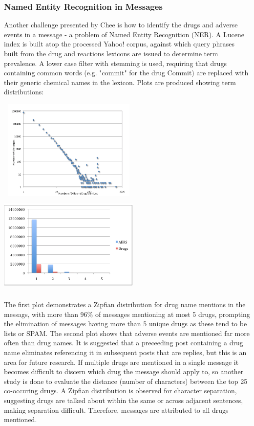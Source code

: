\documentclass[twoside,11pt]{article}
\begin{document}
\subsubsection{Named Entity Recognition in Messages}
Another challenge presented by Chee is how to identify the drugs and adverse events in a message - a problem of Named Entity Recognition (NER). A Lucene index is built atop the processed Yahoo! corpus, against which query phrases built from the drug and reactions lexicons are issued to determine term prevalence. A lower case filter with stemming is used, requiring that drugs containing common words (e.g. "commit" for the drug Commit) are replaced with their generic chemical names in the lexicon. Plots are produced showing term distributions:

\includegraphics[width=7cm, height=5cm]{Figure-1-Zipfian.png}
\includegraphics[width=7cm, height=5cm]{Figure-2-AERS_Drugs.png}

The first plot demonstrates a Zipfian distribution for drug name mentions in the messags, with more than 96\% of messages mentioning at most 5 drugs, prompting the elimination of messages having more than 5 unique drugs as these tend to be lists or SPAM. The second plot shows that adverse events are mentioned far more often than drug names. It is suggested that a preceeding post containing a drug name eliminates referencing it in subsequent posts that are replies, but this is an area for future research. If multiple drugs are mentioned in a single message it becomes difficult to discern which drug the message should apply to, so another study is done to evaluate the distance (number of characters) between the top 25 co-occuring drugs. A Zipfian distribution is observed for character separation, suggesting drugs are talked about within the same or across adjacent sentences, making separation difficult. Therefore, messages are attributed to all drugs mentioned. %
\end{document}

